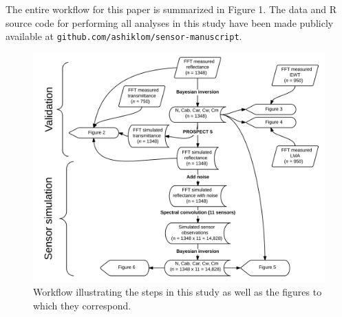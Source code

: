 The entire workflow for this paper is summarized in Figure 1. %
The data and R source code for performing all analyses in this study have been made publicly available at \texttt{github.com/ashiklom/sensor-manuscript}.

\begin{figure}
  \centering
  \includegraphics[width=\textwidth]{2_rtm_inversion/figures/workflow.pdf}
  \caption{%
    Workflow illustrating the steps in this study as well as the figures to which they correspond.
  }\label{fig:pecanrtm-workflow}
\end{figure}
